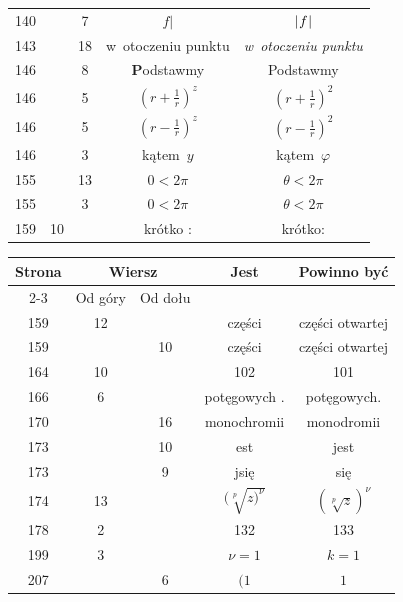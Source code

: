 \documentclass[a4paper,11pt]{article}
\numberwithin{equation}{section}
\begin{document}
\begin{center}
\begin{tabular}{|c|c|c|c|c|}
    140 & & \hphantom{0}7 & $f |$ & $| \hspace{0.05em}  f  \hspace{0.05em} |$ \\
    143 & & 18 & w~otoczeniu punktu & \textit{w~otoczeniu punktu} \\
    146 & & \hphantom{0}8 & \textbf{P}odstawmy & Podstawmy \\
    146 & & \hphantom{0}5 & $( r + \frac{ 1 }{ r } )^{ z }$
           & $( r + \frac{ 1 }{ r } )^{ 2 }$ \\
    146 & & \hphantom{0}5 & $( r - \frac{ 1 }{ r } )^{ z }$
           & $( r - \frac{ 1 }{ r } )^{ 2 }$ \\
    146 & & \hphantom{0}3 & kątem~$y$ & kątem~$\varphi$ \\
    155 & & 13 & $0 < 2\pi$ & $\theta < 2\pi$ \\
    155 & & \hphantom{0}3 & $0 < 2\pi$ & $\theta < 2\pi$ \\
    159 & 10 & & krótko : & krótko: \\
    \hline
  \end{tabular}





  \newpage

  \begin{tabular}{|c|c|c|c|c|}
    \hline
    Strona & \multicolumn{2}{c|}{Wiersz} & Jest
                              & Powinno być \\ \cline{2-3}
    & Od góry & Od dołu & & \\
    \hline
    159 & 12 & & części & części otwartej \\
    159 & & 10 & części & części otwartej \\
    164 & 10 & & 102 & 101 \\
    166 & \hphantom{0}6 & & potęgowych . & potęgowych. \\
    170 & & 16 & monochromii & monodromii \\
    173 & & 10 & est & jest \\
    173 & & \hphantom{0}9 & jsię & się \\
    174 & 13 & & $( \sqrt[p]{ z )^{ \nu } }$ & $( \sqrt[p]{ z } )^{ \nu }$ \\
    178 & \hphantom{0}2 & & 132 & 133 \\
    199 & \hphantom{0}3 & & $\nu = 1$ & $k = 1$ \\
    207 & & \hphantom{0}6 & $( 1$ & $1$ \\
    \hline
  \end{tabular}

\end{center}
\end{document}
